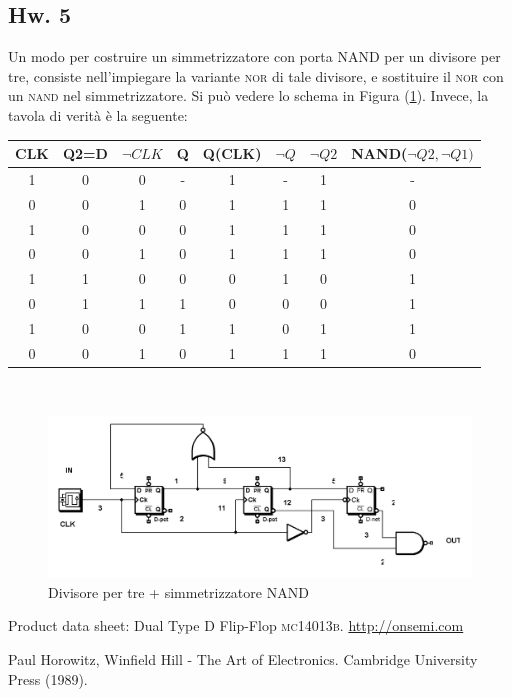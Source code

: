 \documentclass[journal, a4paper]{IEEEtran}
\begin{document}
\subsection{Hw. 5}
Un modo per costruire un simmetrizzatore con porta \textsc{NAND} per un divisore per tre, consiste nell'impiegare la variante \textsc{nor} di tale divisore, e sostituire il \textsc{nor} con un \textsc{nand} nel simmetrizzatore. Si può vedere lo schema in Figura (\ref{fig:hw5}). Invece, la tavola di verità è la seguente:

\begin{table}[h]
\centering
\begin{tabular}{c|c|c|c|c|c|c|c}
\hline \textbf{CLK} & \textbf{Q2=D} & \textbf{$\lnot CLK$} & \textbf{Q} & \textbf{Q(CLK)}& \textbf{$\lnot Q$} & \textbf{$\lnot Q2$} & \textbf{NAND($\lnot Q2, \lnot Q1)$} \\ 
\hline
 1 & 0 & 0 & -& 1& -& 1 & -\\ 
 0 & 0 & 1 & 0& 1& 1& 1 & 0\\
 1 & 0 & 0 & 0& 1& 1& 1 & 0\\ 
 0 & 0 & 1 & 0& 1& 1& 1 & 0\\ 
 1 & 1 & 0 & 0& 0& 1& 0 & 1\\
 0 & 1 & 1 & 1& 0& 0& 0 & 1\\
 1 & 0 & 0 & 1& 1& 0& 1 & 1\\
 0 & 0 & 1 & 0& 1& 1& 1 & 0\\
 \hline
\end{tabular} 
\end{table}
~\\


\begin{figure}
\centering
\includegraphics[width=0.9\linewidth]{./hw5}
\caption{Divisore per tre + simmetrizzatore NAND}
\label{fig:hw5}
\end{figure}


\begin{thebibliography}{5}

	
	Product data sheet: Dual Type D Flip-Flop \textsc{mc14013b}.
	\url{http://onsemi.com}

	Paul Horowitz, Winfield Hill - The Art of Electronics. Cambridge University Press (1989).
	
\end{thebibliography}
\end{document}
